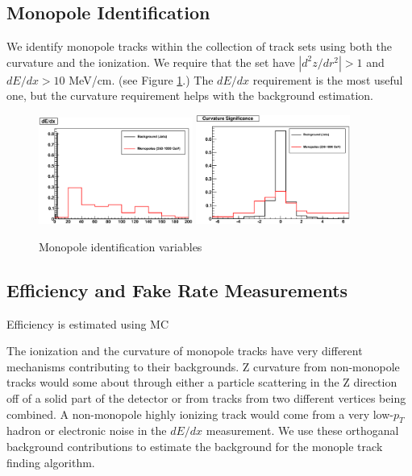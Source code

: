 \subsection{Monopole Identification}

We identify monopole tracks within the collection of track sets using both the curvature and the ionization.  We require that the set have {\color{red} $|d^2 z / dr^2| > 1$} and {\color{red} $dE/dx > 10$ MeV/cm}. (see Figure \ref{fig:MplVars}.) The $dE/dx$ requirement is the most useful one, but the curvature requirement helps with the background estimation.

\begin{figure}
\includegraphics[width=0.45\textwidth]{plots/DeDx.eps}
\hfil
\includegraphics[width=0.45\textwidth]{plots/RZPar2.eps}
\caption{Monopole identification variables}
\label{fig:MplVars}
\end{figure}

\subsection{Efficiency and Fake Rate Measurements}

{\color{red}Efficiency is estimated using MC}

The ionization and the curvature of monopole tracks have very different mechanisms contributing to their backgrounds.  Z curvature from non-monopole tracks would some about through either a particle scattering in the Z direction off of a solid part of the detector or from tracks from two different vertices being combined.  A non-monopole highly ionizing track would come from a very low-$p_T$ hadron or electronic noise in the $dE/dx$ measurement.  We use these orthoganal background contributions to estimate the background for the monople track finding algorithm.

